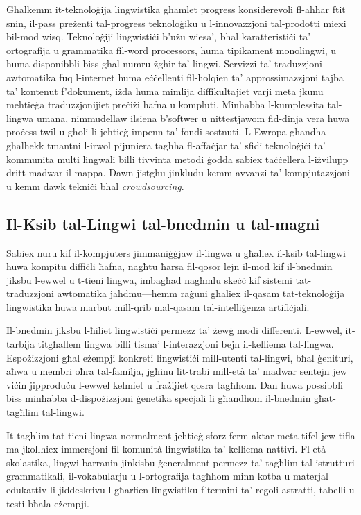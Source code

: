 \begin{multicols}{2}

Għalkemm it-teknoloġija lingwistika għamlet progress konsiderevoli fl-aħħar ftit snin, il-pass preżenti tal-progress teknoloġiku u l-innovazzjoni tal-prodotti miexi bil-mod wisq. Teknoloġiji lingwistiċi b’użu wiesa’, bħal karatteristiċi ta’ ortografija u grammatika fil-word processors, huma tipikament monolingwi, u huma disponibbli biss għal numru żgħir ta’ lingwi. Servizzi ta' traduzzjoni awtomatika fuq l-internet huma eċċellenti fil-ħolqien ta’ approssimazzjoni tajba ta’ kontenut f’dokument, iżda huma mimlija diffikultajiet varji meta jkunu meħtieġa traduzzjonijiet preċiżi ħafna u kompluti. Minħabba l-kumplessita tal-lingwa umana, nimmudellaw ilsiena b’softwer u nittestjawom fid-dinja vera huwa proċess twil u għoli li jeħtieġ impenn ta’ fondi sostnuti. L-Ewropa għandha għalhekk tmantni l-irwol pijuniera tagħha fl-affaċjar ta’ sfidi teknoloġiċi ta’ kommunita multi lingwali billi tivvinta metodi ġodda sabiex taċċellera l-iżvilupp dritt madwar il-mappa. Dawn jistgħu jinkludu kemm avvanzi ta’ kompjutazzjoni u kemm dawk tekniċi bħal \emph{crowdsourcing}.

\subsection{Il-Ksib tal-Lingwi tal-bnedmin u tal-magni}

Sabiex nuru kif il-kompjuters jimmaniġġjaw il-lingwa u għaliex il-ksib tal-lingwi huwa kompitu diffiċli ħafna, nagħtu ħarsa fil-qosor lejn il-mod kif il-bnedmin jiksbu l-ewwel u t-tieni lingwa, imbagħad nagħmlu skeċċ kif sistemi tat-traduzzjoni awtomatika jaħdmu—hemm raġuni għaliex il-qasam tat-teknoloġija lingwistika huwa marbut mill-qrib mal-qasam tal-intelliġenza artifiċjali.
   
Il-bnedmin jiksbu l-ħiliet lingwistiċi permezz ta’ żewġ modi differenti. L-ewwel, it-tarbija titgħallem lingwa billi tisma’ l-interazzjoni bejn il-kelliema tal-lingwa. Espożizzjoni għal eżempji konkreti lingwistiċi mill-utenti tal-lingwi, bħal ġenituri, aħwa u membri oħra tal-familja, jgħinu lit-trabi mill-età ta’ madwar sentejn jew viċin jipproduċu l-ewwel kelmiet u frażijiet qosra tagħhom. Dan huwa possibbli biss minħabba d-dispożizzjoni ġenetika speċjali li għandhom il-bnedmin għat-tagħlim tal-lingwi.
   
It-tagħlim tat-tieni lingwa normalment jeħtieġ sforz ferm aktar meta tifel jew tifla ma jkollhiex immersjoni fil-komunità lingwistika ta’ kelliema nattivi. Fl-età skolastika, lingwi barranin jinkisbu ġeneralment permezz ta’ tagħlim tal-istrutturi grammatikali, il-vokabularju u l-ortografija tagħhom minn kotba u materjal edukattiv li jiddeskrivu l-għarfien lingwistiku f'termini ta' regoli astratti, tabelli u testi bħala eżempji. 


\end{multicols}
